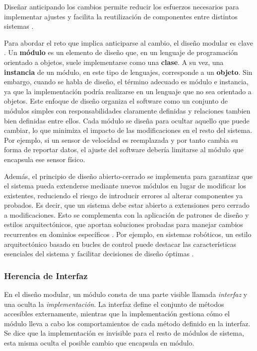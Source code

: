 Diseñar anticipando los cambios permite reducir los esfuerzos necesarios para implementar ajustes y facilita la reutilización de componentes entre distintos sistemas \cite{Parnas02, DBLP:books/daglib/0019719}.

Para abordar el reto que implica anticiparse al cambio, el diseño modular es clave \cite{Parnas1972}.
Un \textbf{módulo} es un elemento de diseño que, en un lenguaje de programación orientado a objetos, suele implementarse como una \textbf{clase}. A su vez, una \textbf{instancia} de un módulo, en este tipo de lenguajes, corresponde a un \textbf{objeto}. Sin embargo, cuando se habla de diseño, el término adecuado es módulo e instancia, ya que la implementación podría realizarse en un lenguaje que no sea orientado a objetos. Este enfoque de diseño organiza el software como un conjunto de módulos simples con responsabilidades claramente definidas y relaciones tambien bien definidas entre ellos. Cada módulo se diseña para ocultar aquello que puede cambiar, lo que minimiza el impacto de las modificaciones en el resto del sistema. Por ejemplo, si un sensor de velocidad es reemplazada y por tanto cambia su forma de reportar datos, el ajuste del software debería limitarse al módulo que encapsula ese sensor físico.

Además, el principio de diseño abierto-cerrado \cite{DBLP:books/ph/Meyer97} se implementa para garantizar que el sistema pueda extenderse mediante nuevos módulos en lugar de modificar los existentes, reduciendo el riesgo de introducir errores al alterar componentes ya probados. Es decir, que un sistema debe estar abierto a extensiones pero cerrado a modificaciones. Esto se complementa con la aplicación de patrones de diseño y estilos arquitectónicos, que aportan soluciones probadas para manejar cambios recurrentes en dominios específicos \cite{Gamma:1995:DPE:186897, DBLP:books/lib/BuschmannHS07}. Por ejemplo, en sistemas robóticos, un estilo arquitectónico basado en bucles de control puede destacar las características esenciales del sistema y facilitar decisiones de diseño óptimas \cite{ShawGarlan1996}.

\subsubsection*{Herencia de Interfaz}
En el diseño modular, un módulo consta de una parte visible llamada \textit{interfaz} y una oculta la \textit{implementación}. La interfaz define el conjunto de métodos accesibles externamente, mientras que la implementación gestiona cómo el módulo lleva a cabo los comportamientos de cada método definido en la interfaz. Se dice que la implementación es invisible para el resto de módulos de sistema, esta misma oculta el posible cambio que encapsula en módulo.

